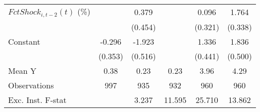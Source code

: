 {\begin{tabular}{l*{5}{c}}
\addlinespace
$ FctShock_{i,t-2}(t)$ (\%)&                     &       0.379         &                     &       0.096         &       1.764\sym{***}\\
                    &                     &     (0.454)         &                     &     (0.321)         &     (0.338)         \\
\addlinespace
Constant            &      -0.296         &      -1.923\sym{***}&                     &       1.336\sym{***}&       1.836\sym{***}\\
                    &     (0.353)         &     (0.516)         &                     &     (0.441)         &     (0.500)         \\
\midrule
Mean Y              &        0.38         &        0.23         &        0.23         &        3.96         &        4.29         \\
Observations        &         997         &         935         &         932         &         960         &         960         \\
Exc. Inst. F-stat   &                     &       3.237         &      11.595         &      25.710         &      13.862         \\
\bottomrule
\end{tabular}
}
